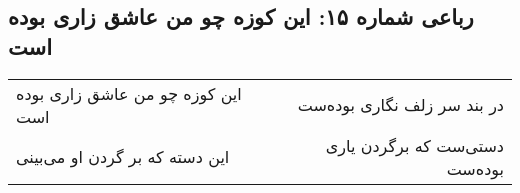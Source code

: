 \begin{center}
\section*{رباعی شماره ۱۵: این کوزه چو من عاشق زاری بوده است}
\label{sec:sh015}
\begin{longtable}{l p{0.5cm} r}
این کوزه چو من عاشق زاری بوده است
&&
در بند سر زلف نگاری بوده‌ست
\\
این دسته که بر گردن او می‌بینی
&&
دستی‌ست که برگردن یاری بوده‌ست
\\
\end{longtable}
\end{center}
